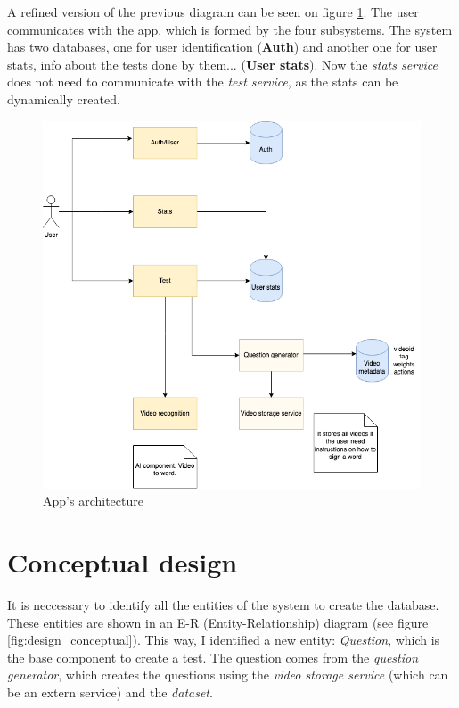 A refined version of the previous diagram can be seen on figure \ref{fig:design_architecture_last}. 
The user communicates with the app, which is formed by the four subsystems. 
The system has two databases, one for user identification (\textbf{Auth}) and another one for user stats, info about the tests done by them... (\textbf{User stats}). 
Now the \textit{stats service} does not need to communicate with the \textit{test service}, as the stats can be dynamically created. \\

\begin{figure}[H]
    \centering
        \includegraphics[width=\textwidth]{assets/diagrams/architecture.png}
    \caption{App's architecture}
    \label{fig:design_architecture_last}
\end{figure}

\section{Conceptual design}
It is neccessary to identify all the entities of the system to create the database. These entities are shown in an 
E-R (Entity-Relationship) diagram (see figure \ref{fig:design_conceptual}). This way, I identified a new entity: 
\textit{Question}, which is the base component to create a test. The question comes from the \textit{question generator}, which creates the questions using the \textit{video storage service} (which can be an extern service) and the \textit{dataset}.

